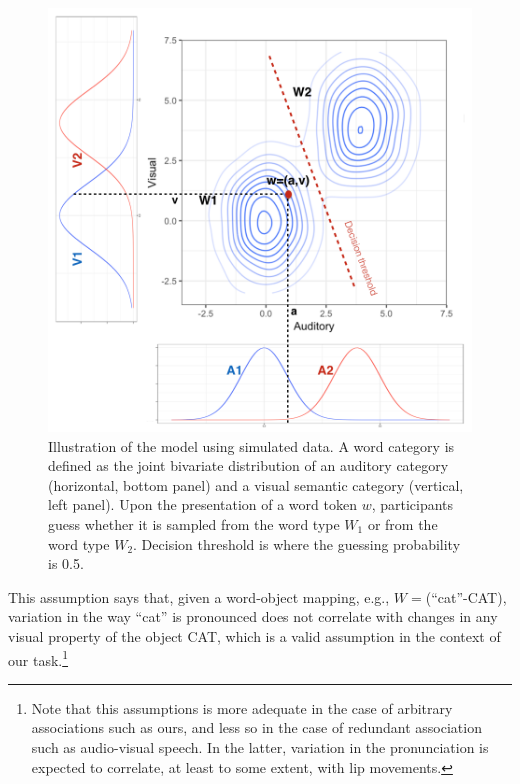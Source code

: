 \documentclass[english,,man,floatsintext]{apa6}
\let\rmarkdownfootnote\footnote%
\def\footnote{\protect\rmarkdownfootnote}
\theoremstyle{definition}
\theoremstyle{definition}
\theoremstyle{definition}
\theoremstyle{remark}
\begin{document}
\begin{figure}[!h]
\includegraphics[width=\textwidth]{pictures/model} \caption{Illustration of the model using simulated data. A word category is defined as the joint bivariate distribution of an auditory category (horizontal, bottom panel) and a visual semantic category (vertical, left panel). Upon the presentation of a word token $w$, participants guess whether it is sampled from the word type $W_1$ or from the word type $W_2$. Decision threshold is where the guessing probability is 0.5.}\label{fig:model}
\end{figure}

\noindent This assumption says that, given a word-object mapping, e.g.,
\(W=\)(\enquote{cat}-CAT), variation in the way \enquote{cat} is
pronounced does not correlate with changes in any visual property of the
object CAT, which is a valid assumption in the context of our
task.\footnote{Note that this assumptions is more adequate in the case of arbitrary associations such as ours, and less so in the case of redundant association such as audio-visual speech. In the latter, variation in the pronunciation is expected to correlate, at least to some extent, with lip movements.}
\end{document}

